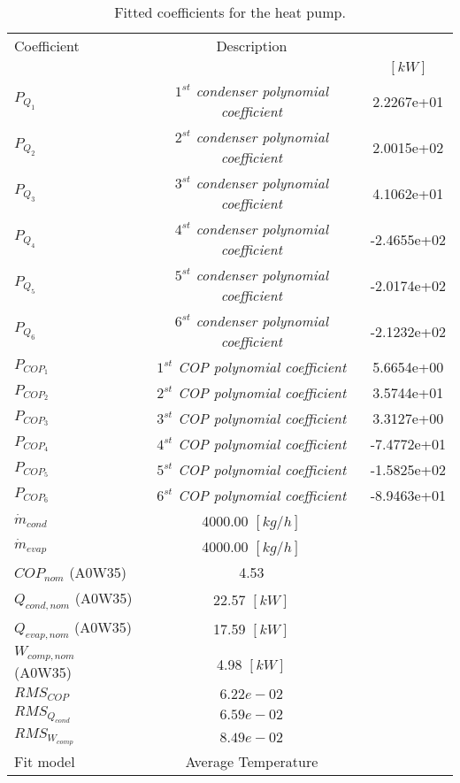 \documentclass[english]{SPFShortReport}
\author{Dani Carbonell}
\begin{document}
\begin{table}[!ht]
\begin{small}
\caption{Fitted coefficients for the heat pump.}
\begin{center}
\resizebox{12cm}{!} 
{
\begin{tabular}{l | c c } 
\hline
\hline
Coefficient &Description & \\ 
 & &$[kW]$\\ 
\hline
$P_{Q_{1}}$ & \emph{$1^{st}$ condenser polynomial coefficient}  & 2.2267e+01    \\ 
$P_{Q_{2}}$ & \emph{$2^{st}$ condenser polynomial coefficient}  & 2.0015e+02    \\ 
$P_{Q_{3}}$ & \emph{$3^{st}$ condenser polynomial coefficient}  & 4.1062e+01    \\ 
$P_{Q_{4}}$ & \emph{$4^{st}$ condenser polynomial coefficient}  & -2.4655e+02    \\ 
$P_{Q_{5}}$ & \emph{$5^{st}$ condenser polynomial coefficient}  & -2.0174e+02    \\ 
$P_{Q_{6}}$ & \emph{$6^{st}$ condenser polynomial coefficient}  & -2.1232e+02    \\ 
\hline
$P_{COP_{1}}$ & \emph{$1^{st}$ COP polynomial coefficient}  & 5.6654e+00    \\ 
$P_{COP_{2}}$ & \emph{$2^{st}$ COP polynomial coefficient}  & 3.5744e+01    \\ 
$P_{COP_{3}}$ & \emph{$3^{st}$ COP polynomial coefficient}  & 3.3127e+00    \\ 
$P_{COP_{4}}$ & \emph{$4^{st}$ COP polynomial coefficient}  & -7.4772e+01    \\ 
$P_{COP_{5}}$ & \emph{$5^{st}$ COP polynomial coefficient}  & -1.5825e+02    \\ 
$P_{COP_{6}}$ & \emph{$6^{st}$ COP polynomial coefficient}  & -8.9463e+01    \\ 
\hline
$\dot m_{cond}$ & 4000.00 $[kg/h]$ \\ 
$\dot m_{evap}$ & 4000.00 $[kg/h]$ \\ 
\hline
$COP_{nom}$ (A0W35)& 4.53 \\ 
$Q_{cond,nom}$ (A0W35)& 22.57 $[kW]$\\ 
$Q_{evap,nom}$ (A0W35)& 17.59 $[kW]$\\ 
$W_{comp,nom}$ (A0W35)& 4.98 $[kW]$\\ 
\hline
 $RMS_{COP}$ & $6.22e-02$ \\ 
 $RMS_{Q_{cond}}$ & $6.59e-02$ \\ 
 $RMS_{W_{comp}}$ & $8.49e-02$ \\ 
\hline
Fit model & Average Temperature\\ 
\hline
\hline
\end{tabular}
}
\label{CoefTable}
\end{center}
\end{small}
\end{table}
\end{document}
